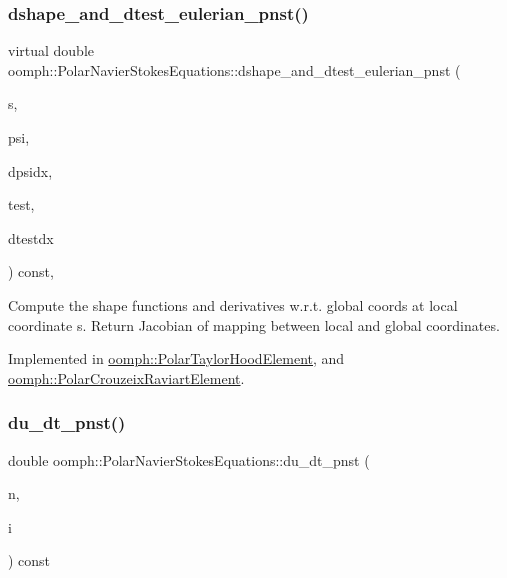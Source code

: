\subsubsection{\texorpdfstring{dshape\+\_\+and\+\_\+dtest\+\_\+eulerian\+\_\+pnst()}{dshape\_and\_dtest\_eulerian\_pnst()}}
{\footnotesize\ttfamily virtual double oomph\+::\+Polar\+Navier\+Stokes\+Equations\+::dshape\+\_\+and\+\_\+dtest\+\_\+eulerian\+\_\+pnst (\begin{DoxyParamCaption}\item[{const \hyperlink{classoomph_1_1Vector}{Vector}$<$ double $>$ \&}]{s,  }\item[{\hyperlink{classoomph_1_1Shape}{Shape} \&}]{psi,  }\item[{\hyperlink{classoomph_1_1DShape}{D\+Shape} \&}]{dpsidx,  }\item[{\hyperlink{classoomph_1_1Shape}{Shape} \&}]{test,  }\item[{\hyperlink{classoomph_1_1DShape}{D\+Shape} \&}]{dtestdx }\end{DoxyParamCaption}) const\hspace{0.3cm}{\ttfamily [protected]}, {}}



Compute the shape functions and derivatives w.\+r.\+t. global coords at local coordinate s. Return Jacobian of mapping between local and global coordinates. 



Implemented in \hyperlink{classoomph_1_1PolarTaylorHoodElement_a5f7b5059497c7d24e5804e1ff9cd34b2}{oomph\+::\+Polar\+Taylor\+Hood\+Element}, and \hyperlink{classoomph_1_1PolarCrouzeixRaviartElement_acd23331a698b1dc87c9d309ed805430a}{oomph\+::\+Polar\+Crouzeix\+Raviart\+Element}.

\mbox{\label{classoomph_1_1PolarNavierStokesEquations_ac6c31807b4f2edd3f00965b11b2a0622}} 
\subsubsection{\texorpdfstring{du\+\_\+dt\+\_\+pnst()}{du\_dt\_pnst()}}
{\footnotesize\ttfamily double oomph\+::\+Polar\+Navier\+Stokes\+Equations\+::du\+\_\+dt\+\_\+pnst (\begin{DoxyParamCaption}\item[{const unsigned \&}]{n,  }\item[{const unsigned \&}]{i }\end{DoxyParamCaption}) const\hspace{0.3cm}{\ttfamily [inline]}}



